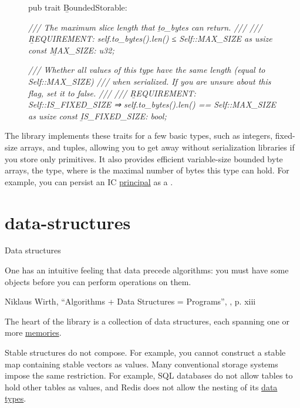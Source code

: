 \documentclass{article}
\begin{document}
\begin{figure}
\begin{code}[rust]
pub trait \label{bounded-storable-trait}\b{BoundedStorable}: \href{#storable-trait}{} {
    \em{/// The maximum slice length that \b{to_bytes} can return.}
    \em{///}
    \em{/// \b{REQUIREMENT}: self.to_bytes().len() ≤ Self::MAX_SIZE as usize}
    const \b{MAX_SIZE}: u32;\label{max-size-attribute}

    \em{/// Whether all values of this type have the same length (equal to Self::MAX_SIZE)}
    \em{/// when serialized. If you are unsure about this flag, set it to \b{false}.}
    \em{///}
    \em{/// \b{REQUIREMENT}: Self::IS_FIXED_SIZE ⇒ self.to_bytes().len() == Self::MAX_SIZE as usize}
    const \b{IS_FIXED_SIZE}: bool;\label{is-fixed-size-attribute}
}
\end{code}
\end{figure}

The library implements these traits for a few basic types, such as integers, fixed-size arrays, and tuples, allowing you to get away without serialization libraries if you store only primitives.
It also provides efficient variable-size bounded byte arrays, the  type, where  is the maximal number of bytes this type can hold.
For example, you can persist an IC \href{https://internetcomputer.org/docs/current/references/ic-interface-spec#principal}{principal} as a .

\section{data-structures}{Data structures}
\epigraph{
    One has an intuitive feeling that data precede algorithms: you must have some objects before you can perform operations on them.
}{Niklaus Wirth, ``Algorithms + Data Structures = Programs'', , p. xiii}

The heart of the  library is a collection of data structures, each spanning one or more \href{#memory}{memories}.

Stable structures do not compose.
For example, you cannot construct a stable map containing stable vectors as values.
Many conventional storage systems impose the same restriction.
For example, SQL databases do not allow tables to hold other tables as values, and Redis does not allow the nesting of its \href{https://redis.io/docs/data-types/}{data types}.
\end{document}
